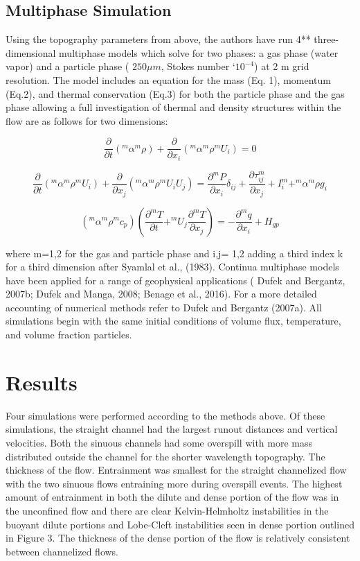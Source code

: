 \subsection{Multiphase Simulation}
Using the topography parameters from above, the authors have run 4** three-dimensional multiphase models which solve for two phases: a gas phase (water vapor) and a particle phase ( \(250 \mu m \), Stokes number \char`\~   \(  10^{-4}\)) at 2 m grid resolution. The model includes an equation for the mass (Eq. 1), momentum (Eq.2), and thermal conservation (Eq.3) for both the particle phase and the gas phase allowing a full investigation of thermal and density structures within the flow are as follows for two dimensions:

\begin{equation}
    \frac{\partial }{\partial t} (^{m} \alpha^{m}\rho) + \frac{\partial }{\partial x_{i}}(^{m} \alpha^{m} \rho^{m} U_{i} ) = 0
\end{equation}

\begin{equation}
    \frac{\partial }{\partial t} ( ^{m} \alpha^{m} \rho^{m} U_{i} ) + \frac{\partial }{\partial x_{j}} (^{m} \alpha^{m} \rho^{m} U_{i} U_{j}) =  \frac{\partial ^{m}P}{\partial x_{i}} \delta_{ij} + \frac{\partial \tau_{ij}^{m} } {\partial x_{j}} + I_{i}^{m} + ^{m} \alpha^{m} \rho g_{i}
\end{equation}

\begin{equation}
        (^{m} \alpha^{m} \rho ^{m} c_{p}) (\frac{\partial ^{m} T }{\partial t} + ^{m}U_{j}\frac{\partial ^{m} T }{\partial x_{j} }) = - \frac{\partial ^{m}q }{\partial x_{i}} + H_{gp}
\end{equation}

where m=1,2 for the gas and particle phase and i,j= 1,2 adding a third index k for a third dimension after Syamlal et al., (1983). Continua multiphase models have been applied for a range of geophysical applications ( Dufek and Bergantz, 2007b; Dufek and Manga, 2008; Benage et al., 2016). For a more detailed accounting of numerical methods refer to Dufek and Bergantz (2007a). 
All simulations begin with the same initial conditions of volume flux, temperature, and volume fraction particles.  

\section{Results}
Four simulations were performed according to the methods above. Of these simulations, the straight channel had the largest runout distances and vertical velocities. Both the sinuous channels had some overspill with more mass distributed outside the channel for the shorter wavelength topography. The thickness of the flow. Entrainment was smallest for the straight channelized flow with the two sinuous flows entraining more during overspill events. The highest amount of entrainment in both the dilute and dense portion of the flow was in the unconfined flow and there are clear Kelvin-Helmholtz instabilities in the buoyant dilute portions and Lobe-Cleft instabilities seen in dense portion outlined in Figure 3. The thickness of the dense portion of the flow is relatively consistent between channelized flows.  


